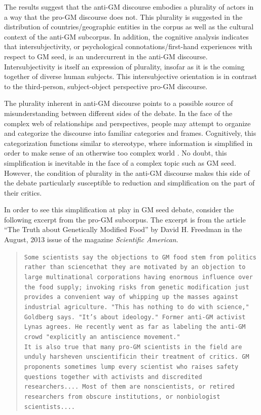 The results suggest that the anti-GM discourse embodies a plurality of actors in a way that the pro-GM discourse does not. This plurality is suggested in the distribution of countries/geographic entities in the corpus as well as the cultural context of the anti-GM subcorpus. In addition, the cognitive analysis indicates that intersubjectivity, or psychological connotations/first-hand experiences with respect to GM seed, is an undercurrent in the anti-GM discourse. Intersubjectivity is itself an expression of plurality, insofar as it is the coming together of diverse human subjects. This intersubjective orientation is in contrast to the third-person, subject-object perspective pro-GM discourse. 

The plurality inherent in anti-GM discourse points to a possible source of misunderstanding between different sides of the debate. In the face of the complex web of relationships and perspectives, people may attempt to organize and categorize the discourse into familiar categories and frames. Cognitively, this categorization functions similar to stereotype, where information is simplified in order to make sense of an otherwise too complex world \citep{Tajfel1981}. No doubt, this simplification is inevitable in the face of a complex topic such as GM seed. However, the condition of plurality in the anti-GM discourse makes this side of the debate particularly susceptible to reduction and simplification on the part of their critics.

In order to see this simplification at play in GM seed debate, consider the following excerpt from the pro-GM subcorpus. The excerpt is from the article ``The Truth about Genetically Modified Food'' by David H. Freedman in the August, 2013 issue of the magazine \textit{Scientific American}. 

\begin{footnotesize}
\begin{quote}
\texttt{\justify Some scientists say the objections to GM food stem from politics rather than science\textemdash that they are motivated by an objection to large multinational corporations having enormous influence over the food supply; invoking risks from genetic modification just provides a convenient way of whipping up the masses against industrial agriculture. "This has nothing to do with science," Goldberg says. "It's about ideology." Former anti-GM activist Lynas agrees.  He recently went as far as labeling the anti-GM crowd "explicitly an antiscience movement."}\\

\texttt{It is also true that many pro-GM scientists in the field are unduly harsh\textemdash even unscientific\textemdash in their treatment of critics. GM proponents sometimes lump every scientist who raises safety questions together with activists and discredited researchers.... Most of them are nonscientists, or retired researchers from obscure institutions, or nonbiologist scientists....}
\end{quote}
\end{footnotesize}

